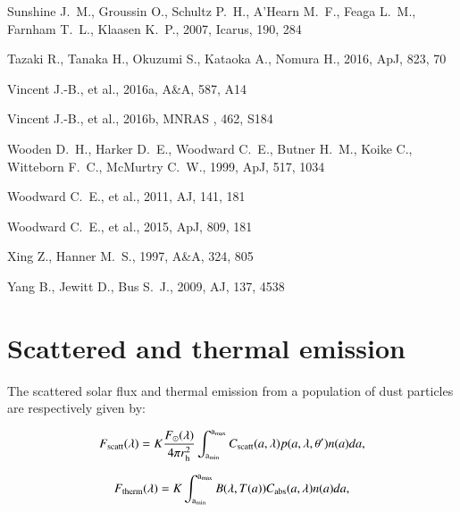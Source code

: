 \documentclass[a4paper,fleqn,usenatbib]{mnras}
\begin{document}
\begin{thebibliography}{99}
 Sunshine J.~M., Groussin O., Schultz P.~H., A'Hearn M.~F., Feaga L.~M., Farnham T.~L., Klaasen K.~P., 2007, Icarus, 190, 284

 Tazaki R., Tanaka H., Okuzumi S., Kataoka A., Nomura H., 2016, ApJ, 823, 70

 Vincent J.-B., et al., 2016a, A\&A, 587, A14

 Vincent J.-B., et al., 2016b, MNRAS , 462, S184

 Wooden D.~H., Harker D.~E., Woodward C.~E., Butner H.~M., Koike C., Witteborn F.~C., McMurtry C.~W., 1999, ApJ, 517, 1034

 Woodward C.~E., et al., 2011, AJ, 141, 181

 Woodward C.~E., et al., 2015, ApJ, 809, 181


 Xing Z., Hanner M.~S., 1997, A\&A, 324, 805

 Yang B., Jewitt D., Bus S.~J., 2009, AJ, 137, 4538

\end{thebibliography}


\appendix
\section{Scattered and thermal emission}
\label{app:emission}

The scattered solar flux and thermal emission from a population of dust particles are respectively given by:

\begin{equation}
F_{\rm scatt}(\lambda) = K \frac{F_{\odot}(\lambda)}{4 \pi r_{\rm h}^2} \int_{\rm a_{\rm min}}^{{\rm a_{\rm max}}} C_{\rm scatt}(a,\lambda) p(a,\lambda,\theta') n(a)da,
\end{equation}


\begin{equation}\label{eq:A2}
F_{\rm therm}(\lambda) = K \int_{\rm a_{\rm min}}^{{\rm a_{\rm max}}} B(\lambda,T(a)) C_{\rm abs}(a,\lambda) n(a)da,
\end{equation}
\end{document}
